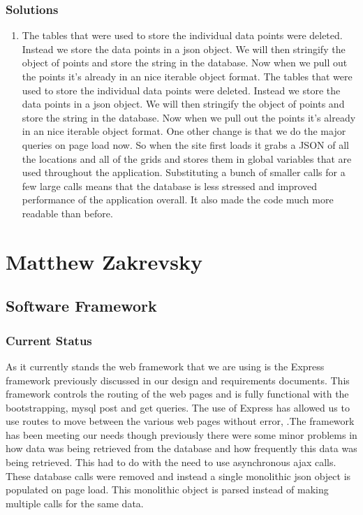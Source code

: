 \documentclass[letterpaper,10pt,serif,titlepage, onecolumn, compsoc]{IEEEtran}
\begin{document}
\subsubsection{Solutions}
\begin{enumerate}
\item The tables that were used to store the individual data points were deleted. Instead we store the data points in a json object. We will then stringify the object of points and store the string in the database. Now when we pull out the points it's already in an nice iterable object format.
 The tables that were used to store the individual data points were deleted. Instead we store the data points in a json object. We will then stringify the object of points and store the string in the database. Now when we pull out the points it's already in an nice iterable object format.
One other change is that we do the major queries on page load now. So when the site first loads it grabs a JSON of all the locations and all of the grids and stores them in global variables that are used throughout the application. Substituting a bunch of smaller calls for a few large calls means that the database is less stressed and improved performance of the application overall. It also made the code much more readable than before.
\end{enumerate}

\section{Matthew Zakrevsky}
\subsection{Software Framework}
\subsubsection{Current Status}
As it currently stands the web framework that we are using is the Express framework previously discussed in our design  and requirements documents. This framework controls the routing of the web pages and is fully functional with the bootstrapping, mysql post and get  queries. The use of Express has allowed us to use routes to move between the various web pages without error, .The  framework has been meeting our needs though previously there were some minor problems in how data was being retrieved from the database and how frequently this data was being retrieved. This had to do with the need to use asynchronous ajax calls. These database calls were removed and instead a single monolithic json object is populated on page load. This monolithic object is parsed instead of making multiple calls for the same data.
\end{document}
